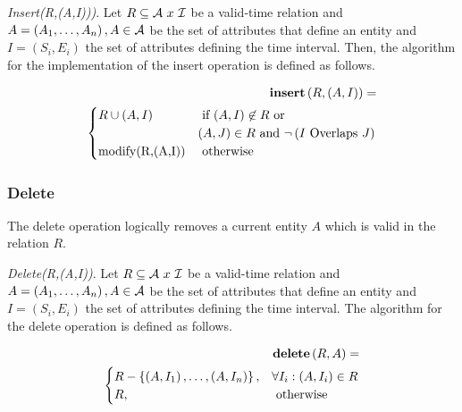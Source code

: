 \begin{definition}
 \emph{Insert(R,(A,I)))}.
Let $R \subseteq \mathcal{A}\  x\  \mathcal{I}$ be a valid-time relation and  $A=\left(A_1, \ldots, A_n \right), A \in \mathcal{A}$ be the set of attributes that define an entity and $I = \left(S_i,E_i\right)$ the set of attributes defining the time interval. Then, the algorithm for the implementation of the insert operation is defined as follows.
\end{definition}



\begin{align}
\label{eq:insert}
\INS \left(R ,\left(A, I\right)\right) =\\
\begin{cases}
\nonumber
R \cup \left(A, I \right) & \mbox{ if }  (A, I ) \not \in R  \mbox{ or } \\
 &   \left(A, J\right) \in R \mbox{ and } \lnot \left(I \mbox{ Overlaps } J\right) \\
\mbox{modify(R,(A,I))} & \mbox{ otherwise }    %
\end{cases} 	
\end{align}

\subsubsection{\label{subsubsec:del}Delete}
The delete operation logically removes a current entity $A$ which is valid in the relation $R$.
\begin{definition}
 \emph{Delete(R,(A,I))}.
Let $R \subseteq \mathcal{A}\  x\  \mathcal{I}$ be a valid-time relation and  $A=\left(A_1, \ldots, A_n \right), A \in \mathcal{A}$ be the set of attributes that define an entity and $I = \left(S_i,E_i\right)$ the set of attributes defining the time interval. The algorithm for the delete operation is defined as follows.
\end{definition}


\begin{align}
\label{eq:delete}
\mbox{\textbf{delete}} \left(R ,A \right) =\\
\begin{cases}
\nonumber
R - \left \lbrace \left(A, I_1 \right),  \ldots, \left(A, I_n \right)   \right \rbrace, & \forall I_i : \left( A, I_i \right) \in R\\
R, & \mbox{ otherwise }  
\end{cases} 	
\end{align}

